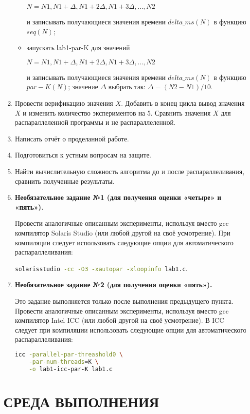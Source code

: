 \documentclass[14pt, a4paper, oneside, final]{extarticle}
\begin{document}
\begin{enumerate}
\begin{itemize}
        $N = N1, N1 + \Delta, N1 + 2\Delta, N1 + 3\Delta, ..., N2$

        и записывать получающиеся значения времени $delta\_ms(N)$ в функцию $seq(N)$;
        \item запускать lab1-par-K для значений

        $N = N1, N1 + \Delta, N1 + 2\Delta, N1 + 3\Delta, ..., N2$

        и записывать получающиеся значения времени $delta\_ms(N)$ в функцию $par-K(N)$;
        значение $\Delta$ выбрать так: $\Delta = (N2 - N1) / 10$.
    \end{itemize}
 \item Провести верификацию значения $X$. Добавить в конец цикла вывод значения $X$ и изменить количество экспериментов на 5. Сравнить значения $X$ для распараллеленной программы и не распараллеленной.
 \item Написать отчёт о проделанной работе.
 \item Подготовиться к устным вопросам на защите.
 \item Найти вычислительную сложность алгоритма до и после распараллеливания, сравнить полученные результаты.
 \item \textbf{Необязательное задание №1 (для получения оценки «четыре» и «пять»).}

 Провести аналогичные описанным эксперименты, используя вместо gcc компилятор Solaris Studio (или любой другой на своё усмотрение). При компиляции следует использовать следующие опции для автоматического распараллеливания:

 \lstinline[language=Bash]{solarisstudio -cc -O3 -xautopar -xloopinfo lab1.c}.
 \item \textbf{Необязательное задание №2 (для получения оценки «пять»).}

 Это задание выполняется только после выполнения предыдущего пункта. Провести аналогичные описанным эксперименты, используя вместо gcc компилятор Intel ICC (или любой другой на своё усмотрение). В ICC следует при компиляции использовать следующие опции для автоматического распараллеливания:

 \begin{lstlisting}[language=Bash]
 icc -parallel-par-threashold0 \
    -par-num-threads=K \
    -o lab1-icc-par-K lab1.c
 \end{lstlisting}
\end{enumerate}

\clearpage
\section*{СРЕДА ВЫПОЛНЕНИЯ}
\end{document}
